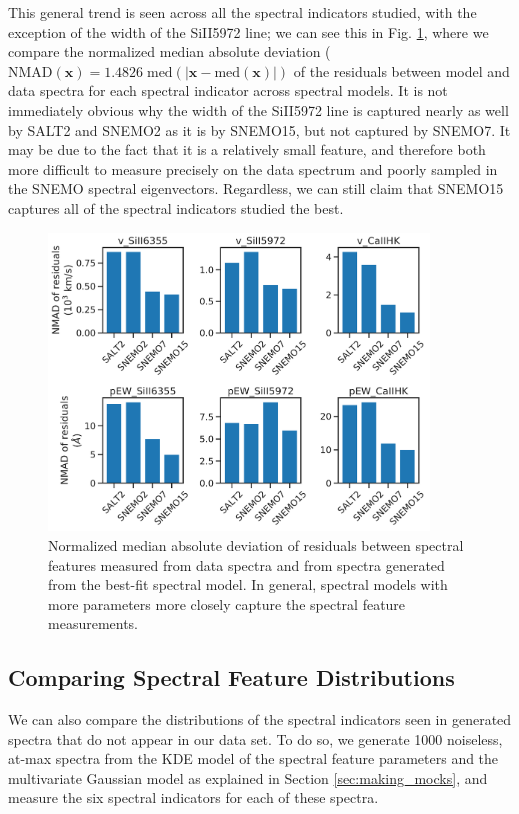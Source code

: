 This general trend is seen across all the spectral indicators studied, with the exception of the width of the SiII5972 line; we can see this in Fig. \ref{fig:model_spec_feat_recovery}, where we compare the normalized median absolute deviation ($\text{NMAD}(\bm{x})=1.4826\;\text{med}(|\bm{x}-\text{med}(\bm{x})|)$ of the residuals between model and data spectra for each spectral indicator across spectral models. It is not immediately obvious why the width of the SiII5972 line is captured nearly as well by SALT2 and SNEMO2 as it is by SNEMO15, but not captured by SNEMO7. It may be due to the fact that it is a relatively small feature, and therefore both more difficult to measure precisely on the data spectrum and poorly sampled in the SNEMO spectral eigenvectors. Regardless, we can still claim that SNEMO15 captures all of the spectral indicators studied the best.

\begin{figure}
    \centering
    \includegraphics[width=0.9\textwidth]{figures/snemo_kde/model_spec_feat_recovery.pdf}
    \caption{Normalized median absolute deviation of residuals between spectral features measured from data spectra and from spectra generated from the best-fit spectral model. In general, spectral models with more parameters more closely capture the spectral feature measurements.}
    \label{fig:model_spec_feat_recovery}
\end{figure}

\subsection{Comparing Spectral Feature Distributions}
We can also compare the distributions of the spectral indicators seen in generated spectra that do not appear in our data set. To do so, we generate 1000 noiseless, at-max spectra from the KDE model of the spectral feature parameters and the multivariate Gaussian model as explained in Section \ref{sec:making_mocks}, and measure the six spectral indicators for each of these spectra.

